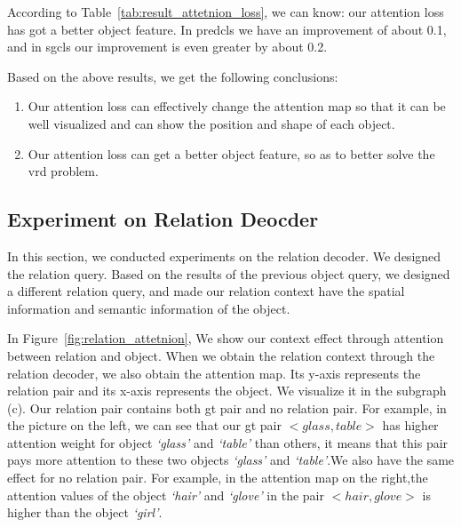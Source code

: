 According to Table~\ref{tab:result_attetnion_loss}, we can know: our attention loss has got a better object feature. In predcls we have an improvement of about 0.1, and in sgcls our improvement is even greater by about 0.2.

Based on the above results, we get the following conclusions:
\begin{enumerate}
	\item Our attention loss can effectively change the attention map so that it can be well visualized and can show the position and shape of each object.
	\item Our attention loss can get a better object feature, so as to better solve the vrd problem.
\end{enumerate}

\subsection{Experiment on Relation Deocder}
In this section, we conducted experiments on the relation decoder. We designed the relation query. Based on the results of the previous object query, we designed a different relation query, and made our relation context have the spatial information and semantic information of the object.


In Figure~\ref{fig:relation_attetnion}, We show our context effect through attention between relation and object. When we obtain the relation context through the relation decoder, we also obtain the attention map. Its y-axis represents the relation pair and its x-axis represents the object. We visualize it in the subgraph (c). Our relation pair contains both gt pair and no relation pair. For example, in the picture on the left, we can see that our gt pair $<glass, table> $ has higher attention weight for object \textit{`glass'} and \textit{`table'} than others, it means that this pair pays more attention to these two objects \textit{`glass'} and \textit{`table'}.We also have the same effect for no relation pair. For example, in the attention map on the right,the attention values of the object \textit{ `hair'} and \textit{`glove'} in the pair $<hair, glove> $   is higher than the object \textit{`girl'}.

